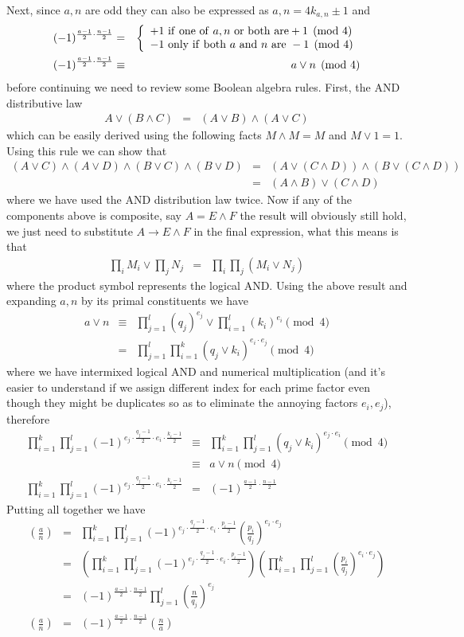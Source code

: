 \documentclass[aps,preprint,preprintnumbers,nofootinbib,showpacs,prd]{revtex4-1}
\newcommand{\nbea}{\begin{eqnarray*}}
\newcommand{\neea}{\end{eqnarray*}}
\begin{document}
Next, since $a, n$ are odd they can also be expressed as $a,n = 4k_{a,n} \pm 1$ and
%
\nbea
(-1)^{\frac{a-1}{2}\cdot\frac{n-1}{2}} & = & \left \{
\begin{array}{l}
+1 {\rm~if~one~of~} a, n {\rm~or~both~are} +1 \pmod{4} \\
-1 {\rm~only~if~both~} a {\rm~and~} n {\rm~are~} -1 \pmod{4}  
\end{array}
\right . \\
(-1)^{\frac{a-1}{2}\cdot\frac{n-1}{2}} & \equiv & a \lor n \pmod{4}
\neea
%
before continuing we need to review some Boolean algebra rules. First, the AND distributive law
%
\nbea
A \lor (B \land C) & = & (A \lor B)\land(A \lor C)
\neea
%
which can be easily derived using the following facts $M \land M = M$ and $M \lor 1 = 1$. Using this rule we can show that
%
\nbea
(A \lor C) \land (A \lor D) \land(B \lor C) \land (B \lor D) & = & (A \lor (C \land D)) \land (B \lor (C \land D)) \\
& = & (A \land B) \lor (C \land D)
\neea
%
where we have used the AND distribution law twice. Now if any of the components above is composite, say $A = E \land F$ the result will obviously still hold, we just need to substitute $A \to E \land F$ in the final expression, what this means is that
%
\nbea
\prod_i M_i \lor \prod_j N_j & = & \prod_i \prod_j (M_i \lor N_j)
\neea
%
where the product symbol represents the logical AND. Using the above result and expanding $a,n$ by its primal constituents we have
%
\nbea
a \lor n & \equiv & \prod_{j=1}^l (q_j)^{e_j} \lor \prod_{i=1}^l (k_i)^{e_i} \pmod{4} \\
& = & \prod_{j=1}^l\prod_{i=1}^k (q_j \lor k_i)^{e_i\cdot e_j} \pmod{4}
\neea
%
where we have intermixed logical AND and numerical multiplication (and it's easier to understand if we assign different index for each prime factor even though they might be duplicates so as to eliminate the annoying factors $e_i, e_j$), therefore
%
\nbea
\prod_{i=1}^k\prod_{j=1}^l (-1)^{e_j\cdot\frac{q_j-1}{2}\cdot e_i\cdot\frac{k_i-1}{2}} & \equiv & \prod_{i=1}^k\prod_{j=1}^l  (q_j \lor k_i)^{e_j\cdot e_i} \pmod{4} \\
& \equiv & a \lor n \pmod{4} \\
\prod_{i=1}^k\prod_{j=1}^l (-1)^{e_j\cdot\frac{q_j-1}{2}\cdot e_i\cdot\frac{k_i-1}{2}} & = & (-1)^{\frac{a-1}{2}\cdot\frac{n-1}{2}}
\neea
%
Putting all together we have
%
\nbea
\left ( \frac{a}{n}\right ) & = & \prod_{i=1}^k\prod_{j=1}^l (-1)^{e_j\cdot\frac{q_j-1}{2}\cdot e_i\cdot \frac{p_i-1}{2}} \left ( \frac{p_i}{q_j} \right )^{e_i\cdot e_j} \\
& = & \left ( \prod_{i=1}^k\prod_{j=1}^l (-1)^{e_j\cdot\frac{q_j-1}{2}\cdot e_i\cdot \frac{p_i-1}{2}} \right ) \left ( \prod_{i=1}^k\prod_{j=1}^l \left ( \frac{p_i}{q_j} \right )^{e_i\cdot e_j} \right ) \\
& = & (-1)^{\frac{a-1}{2}\cdot\frac{n-1}{2}} \prod_{j=1}^l \left ( \frac{n}{q_j} \right )^{e_j} \\
\left ( \frac{a}{n}\right ) & = & (-1)^{\frac{a-1}{2}\cdot\frac{n-1}{2}} \left ( \frac{n}{a}\right ) 
\neea
%
\end{document}
